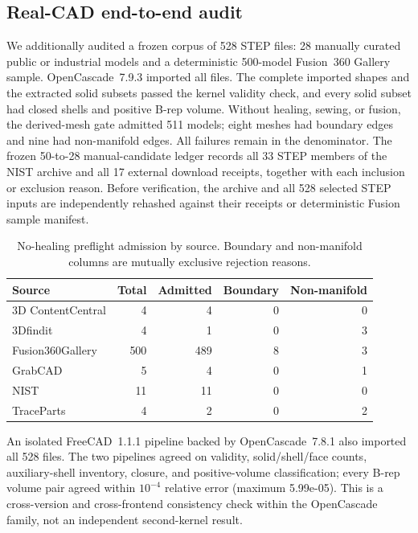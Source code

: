\subsection{Real-CAD end-to-end audit}
\label{sec:real-cad-audit}

We additionally audited a frozen corpus of 528 STEP files: 28 manually curated
public or industrial models and a deterministic 500-model Fusion~360 Gallery
sample.  OpenCascade~7.9.3 imported all files.  The complete imported shapes and
the extracted solid subsets passed the kernel validity check, and every solid
subset had closed shells and positive B-rep volume.  Without healing, sewing,
or fusion, the derived-mesh gate admitted 511 models; eight meshes had boundary
edges and nine had non-manifold edges.  All failures remain in the denominator.
The frozen 50-to-28 manual-candidate ledger records all 33 STEP members of the
NIST archive and all 17 external download receipts, together with each inclusion
or exclusion reason.  Before verification, the archive and all 528 selected
STEP inputs are independently rehashed against their receipts or deterministic
Fusion sample manifest.

\begin{table}[t]
\centering
\caption{No-healing preflight admission by source. Boundary and non-manifold
columns are mutually exclusive rejection reasons.}
\label{tab:real-cad-admission}
\begin{tabular}{lrrrr}
\toprule
Source & Total & Admitted & Boundary & Non-manifold \\
\midrule
3D ContentCentral & 4 & 4 & 0 & 0 \\
3Dfindit & 4 & 1 & 0 & 3 \\
Fusion360Gallery & 500 & 489 & 8 & 3 \\
GrabCAD & 5 & 4 & 0 & 1 \\
NIST & 11 & 11 & 0 & 0 \\
TraceParts & 4 & 2 & 0 & 2 \\
\bottomrule
\end{tabular}
\end{table}

An isolated FreeCAD~1.1.1 pipeline backed by OpenCascade~7.8.1 also imported all
528 files.  The two pipelines agreed on validity, solid/shell/face counts,
auxiliary-shell inventory, closure, and positive-volume classification; every
B-rep volume pair agreed within \(10^{-4}\) relative error (maximum
5.99e-05).  This is a
cross-version and cross-frontend consistency check within the OpenCascade
family, not an independent second-kernel result.

